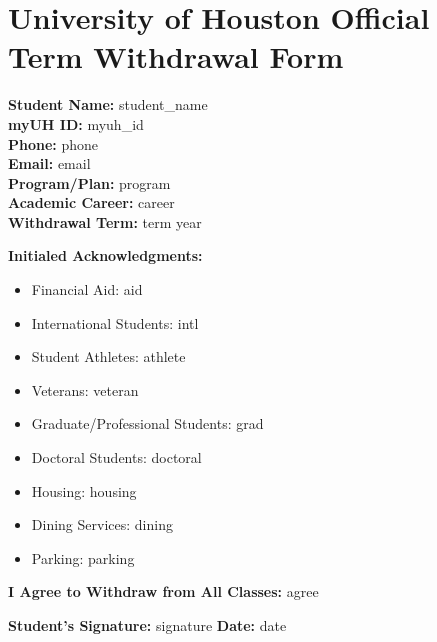 \documentclass[12pt]{article}
\begin{document}
\section*{University of Houston Official Term Withdrawal Form}

\textbf{Student Name:} {{ student_name }} \\
\textbf{myUH ID:} {{ myuh_id }} \\
\textbf{Phone:} {{ phone }} \\
\textbf{Email:} {{ email }} \\
\textbf{Program/Plan:} {{ program }} \\
\textbf{Academic Career:} {{ career }} \\
\textbf{Withdrawal Term:} {{ term }} {{ year }}

\vspace{1em}

\textbf{Initialed Acknowledgments:}
\begin{itemize}[leftmargin=2em]
\item Financial Aid: {{ aid }}
\item International Students: {{ intl }}
\item Student Athletes: {{ athlete }}
\item Veterans: {{ veteran }}
\item Graduate/Professional Students: {{ grad }}
\item Doctoral Students: {{ doctoral }}
\item Housing: {{ housing }}
\item Dining Services: {{ dining }}
\item Parking: {{ parking }}
\end{itemize}


\vspace{1em}
\textbf{I Agree to Withdraw from All Classes:} {{ agree }}


\vspace{2em}
\textbf{Student’s Signature:} {{ signature }} \hfill \textbf{Date:} {{ date }}
\end{document}
